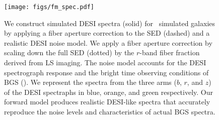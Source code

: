 \begin{figure}
\begin{center}
\texttt{[image: figs/fm\_spec.pdf]}
\caption{
    We construct simulated DESI spectra (solid) for \lgal~simulated galaxies by
    applying a fiber aperture correction to the SED (dashed) and a realistic
    DESI noise model. 
    We apply a fiber aperture correction by scaling down the full SED (dotted)
    by the $r$-band fiber fraction derived from LS imaging. 
    The noise model accounts for the DESI spectrograph response and the bright
    time observing conditions of BGS ().  
    We represent the spectra from the three arms ($b$, $r$, and $z$) of the
    DESI spectraphs in blue, orange, and green respectively. 
    Our forward model produces realistic DESI-like spectra that accurately
    reproduce the noise levels and characteristics of actual BGS spectra. 
    } \label{fig:spec}
\end{center}
\end{figure}

